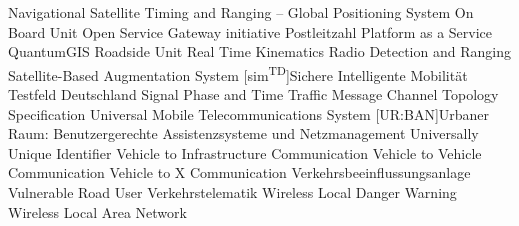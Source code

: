  {Navigational Satellite Timing and Ranging – Global Positioning System}
 {On Board Unit}
 {Open Service Gateway initiative}
 {Postleitzahl}
 {Platform as a Service}
 {QuantumGIS}
 {Roadside Unit}
 {Real Time Kinematics}
 {Radio Detection and Ranging}
 {Satellite-Based Augmentation System}
[sim\textsuperscript{TD}]{Sichere Intelligente Mobilität Testfeld Deutschland}
 {Signal Phase and Time}
 {Traffic Message Channel}
 {Topology Specification}
 {Universal Mobile Telecommunications System}
[UR:BAN]{Urbaner Raum: Benutzergerechte Assistenzsysteme und Netzmanagement}
 {Universally Unique Identifier}
 {Vehicle to Infrastructure Communication}
 {Vehicle to Vehicle Communication}
 {Vehicle to X Communication}
 {Verkehrsbeeinflussungsanlage}
 {Vulnerable Road User}
 {Verkehrstelematik}
 {Wireless Local Danger Warning}
 {Wireless Local Area Network}
